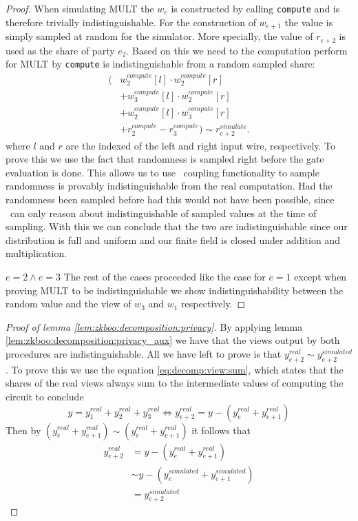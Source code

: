 \begin{proof}
  When simulating MULT the $w_{e}$ is constructed by calling \texttt{compute}
  and is therefore trivially indistinguishable. For the construction of
  $w_{e+1}$ the value is simply sampled at random for the simulator. More
  specially, the value of $r_{e+2}$ is used as the share of party $e_{2}$.
  Based on this we need to the computation perform for MULT by \texttt{compute}
  is indistinguishable from a random sampled share:
  \begin{align*}
    (&w_{2}^{compute}[l] \cdot  w_{2}^{compute}[r] \\
     &+ w_{3}^{compute}[l] \cdot w_{2}^{compute}[r] \\
     &+ w_{2}^{compute}[l] \cdot w_{3}^{compute}[r] \\
     &+ r^{compute}_{2} - r^{compute}_{3}) \sim r^{simulate}_{e+2}.
  \end{align*}
  where $l$ and $r$ are the indexed of the left and right input wire,
  respectively.
  To prove this we use the fact that randomness is sampled right before the gate
  evaluation is done. This allows us to use \easycrypt\ coupling functionality
  to sample randomness is provably indistinguishable from the real computation.
  Had the randomness been sampled before had this would not have been possible,
  since \easycrypt\ can only reason about indistinguishable of sampled values at
  the time of sampling.
  With this we can conclude that the two are indistinguishable since our
  distribution is full and uniform and our finite field is closed under addition
  and multiplication.

  \noindent$e=2 \land e=3$ The rest of the cases proceeded like the case for
  $e=1$ except when proving MULT to be indistinguishable we show
  indistinguishability between the random value and the view of $w_{3}$ and
  $w_{1}$ respectively.
\end{proof}

\begin{proof}[Proof of lemma \ref{lem:zkboo:decomposition:privacy}]
  By applying lemma \ref{lem:zkboo:decomposition:privacy_aux} we have that the
  views output by both procedures are indistinguishable. All we have left to prove
  is that $y^{real}_{e+2} \sim y^{simulated}_{e+2}$. To prove this we use the
  equation \ref{eq:decomp:view:sum}, which states that the shares of the real views always sum to
  the intermediate values of computing the circuit to conclude
  \[
  y = y^{real}_{1} + y^{real}_{2} + y^{real}_{3} \iff y^{real}_{e+2} = y - (y^{real}_{e} + y^{real}_{e+1})
  \]
  Then by
  $(y^{real}_{e} + y^{real}_{e+1}) \sim (y^{real}_{e} + y^{real}_{e+1})$ it
  follows that
  \begin{align*}
    y^{real}_{e+2} &= y - (y^{real}_{e} + y^{real}_{e+1}) \\
                      &\sim y - (y^{simulated}_{e} + y^{simulated}_{e+1}) \\
                      &= y^{simulated}_{e+2}
  \end{align*}
\end{proof}


